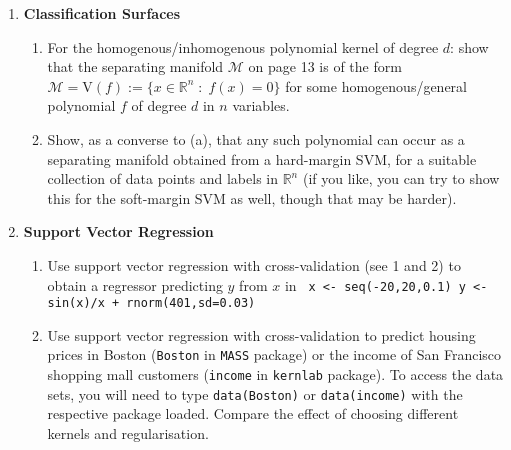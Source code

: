 \documentclass[a4paper,10pt,oneside]{article}
\begin{document}
\begin{enumerate}
\newpage
\item {\bf Classification Surfaces}
\begin{enumerate}
\item For the homogenous/inhomogenous polynomial kernel of degree $d$: show that the separating manifold $\mathcal{M}$ on page 13 is of the form $\mathcal{M}=\mbox{V}(f):=\{x\in\mathbb{R}^n\;:\; f(x) = 0\}$ for some homogenous/general polynomial $f$ of degree $d$ in $n$ variables.
\item Show, as a converse to (a), that any such polynomial can occur as a separating manifold obtained from a hard-margin SVM, for a suitable collection of data points and labels in $\mathbb{R}^n$ (if you like, you can try to show this for the soft-margin SVM as well, though that may be harder).
\end{enumerate}


\item {\bf Support Vector Regression}
\begin{enumerate}
\item Use support vector regression with cross-validation (see 1 and 2) to obtain a regressor predicting $y$ from $x$ in
 \texttt{
 x <- seq(-20,20,0.1)
 y <- sin(x)/x + rnorm(401,sd=0.03)}
\item Use support vector regression with cross-validation to predict housing prices in Boston (\texttt{Boston} in \texttt{MASS} package) or the income of San Francisco shopping mall customers (\texttt{income} in \texttt{kernlab} package). To access the data sets, you will need to type \texttt{data(Boston)} or \texttt{data(income)} with the respective package loaded.
    Compare the effect of choosing different kernels and regularisation.
\end{enumerate}


\end{enumerate}
\end{document}
